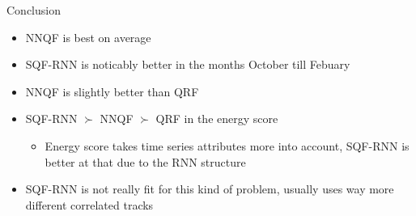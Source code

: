 \documentclass[10pt,aspectratio=169]{beamer}
\begin{document}
\begin{frame}{Conclusion}
    \begin{itemize}
        \item NNQF is best on average
        \item SQF-RNN is noticably better in the months October till Febuary
        \item NNQF is slightly better than QRF
        \item SQF-RNN \(\succ\) NNQF \(\succ\) QRF in the energy score
        \begin{itemize}
            \item Energy score takes time series attributes more into account, SQF-RNN is better at that due to the RNN structure
        \end{itemize}
        \item SQF-RNN is not really fit for this kind of problem, usually uses way more different correlated tracks
    \end{itemize}
\end{frame}
\end{document}
